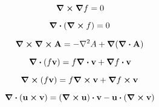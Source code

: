 \begin{equation}
\label{app:eqn:curl_gradiente}
    \curl{\grad{f}}=0
\end{equation}

\begin{equation}
\label{app:eqn:div_curl}
    \div(\curl{f})=0
\end{equation}

\begin{equation}
\label{app:eqn:curl_curl}
  \curl\curl{\vb{A}}=-\laplacian{A}+\grad(\div{\vb{A}})
\end{equation}

\begin{equation}
\label{app:eqn:div_scalare_vettore}
    \div(f\vb{v})=f\div{\vb{v}}+\grad{f}\vdot\vb{v}
\end{equation}

\begin{equation}
\label{app:eqn:curl_scalare_vettore}
    \curl(f\vb{v})=f\curl{\vb{v}}+\grad{f}\cp\vb{v}
\end{equation}

\begin{equation}
\label{app:eqn:div_cp}
  \div(\vb{u}\cp\vb{v})=(\curl{\vb{u}})\vdot\vb{v}-\vb{u}\vdot(\curl{\vb{v}})
\end{equation}
